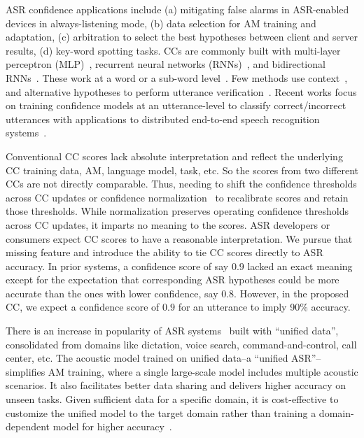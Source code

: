 \documentclass[a4paper]{article}
\begin{document}
ASR confidence applications include (a) mitigating false alarms in ASR-enabled devices in always-listening mode, (b) data selection for AM training and adaptation, (c) arbitration to select the best hypotheses between client and server results, (d) key-word spotting tasks. CCs are commonly built with multi-layer perceptron (MLP)~\cite{Huang2013a}, recurrent neural networks (RNNs)~\cite{Kalgaonkar2015EstimatingNetworks}, and bidirectional RNNs~\cite{Del-Agua2018Speaker-adaptedNetworks, Ragni2019ConfidenceNetworks}. These work at a word or a sub-word level~\cite{CMsurvey_Jiang_SpeechCommunication06}. Few methods use context~\cite{Sarma2004}, and alternative hypotheses to perform utterance verification~\cite{Setlur1996}. Recent works focus on training confidence models at an utterance-level to classify correct/incorrect utterances with applications to distributed end-to-end speech recognition systems~\cite{Kumar2020a, Li2021}. 

Conventional CC scores lack absolute interpretation and reflect the underlying CC training data, AM, language model, task, etc. So the scores from two different CCs are not directly comparable. Thus, needing to shift the confidence thresholds across CC updates or confidence normalization~\cite{Kumar2014} to recalibrate scores and retain those thresholds. While normalization preserves operating confidence thresholds across CC updates, it imparts no meaning to the scores. ASR developers or consumers expect CC scores to have a reasonable interpretation. We pursue that missing feature and introduce the ability to tie CC scores directly to ASR accuracy. In prior systems, a confidence score of say $0.9$ lacked an exact meaning except for the expectation that corresponding ASR hypotheses could be more accurate than the ones with lower confidence, say $0.8$. However, in the proposed CC, we expect a confidence score of $0.9$ for an utterance to imply 90\% accuracy. 

There is an increase in popularity of ASR systems~\cite{Ochiai2017UnifiedBeamforming, Fujita2016} built with ``unified data'', consolidated from domains like dictation, voice search, command-and-control, call center, etc.  The acoustic model trained on unified data--a ``unified ASR''--simplifies AM training, where a single large-scale model includes multiple acoustic scenarios. It also facilitates better data sharing and delivers higher accuracy on unseen tasks. Given sufficient data for a specific domain, it is cost-effective to customize the unified model to the target domain rather than training a domain-dependent model for higher accuracy~\cite{Li2020, Bell2020}.  
\end{document}
